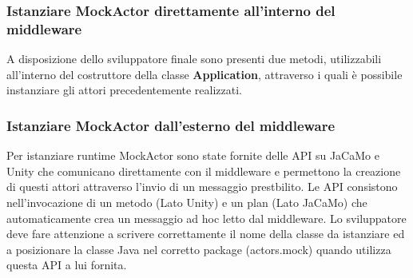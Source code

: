 \subsubsection{Istanziare MockActor direttamente all'interno del middleware}

A disposizione dello sviluppatore finale sono presenti due metodi, utilizzabili all'interno del costruttore della classe \textbf{Application}, attraverso i quali è possibile instanziare gli attori precedentemente realizzati.



\subsubsection{Istanziare MockActor dall'esterno del middleware}

Per istanziare runtime MockActor sono state fornite delle API su JaCaMo e Unity che comunicano direttamente con il middleware e permettono la creazione di questi attori attraverso l'invio di un messaggio prestbilito. Le API consistono nell'invocazione di un metodo (Lato Unity) e un plan (Lato JaCaMo) che automaticamente crea un messaggio ad hoc letto dal middleware. Lo sviluppatore deve fare attenzione a scrivere correttamente il nome della classe da istanziare ed a posizionare la classe Java nel corretto package (actors.mock) quando utilizza questa API a lui fornita.
